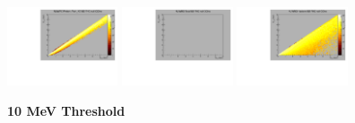 \begin{center}
  \includegraphics[width=0.245\textwidth]{plots/response_matrix/Proton+Pion_KE_FHC_CCInc_null.pdf}
  \includegraphics[width=0.245\textwidth]{plots/response_matrix/Total_FHC_CCInc_null.pdf}
  \includegraphics[width=0.245\textwidth]{plots/response_matrix/Hadrons_FHC_CCInc_null.pdf}

\end{center}

\textbf{10 MeV Threshold}

